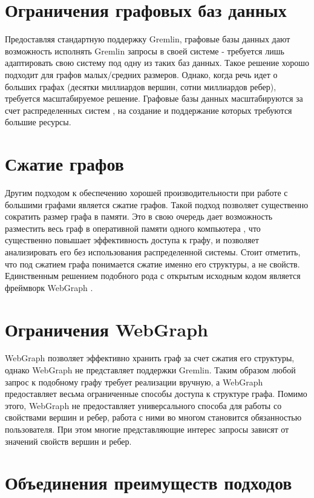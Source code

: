 \documentclass[times,specification,annotation]{itmo-student-thesis}
\begin{document}
\section{Ограничения графовых баз данных}

Предоставляя стандартную поддержку Gremlin, графовые базы данных дают возможность исполнять Gremlin запросы в своей системе - требуется лишь адаптировать свою систему под одну из таких баз данных. Такое решение хорошо подходит для графов малых/средних размеров. Однако, когда речь идет о больших графах (десятки миллиардов вершин, сотни миллиардов ребер), требуется масштабируемое решение. Графовые базы данных масштабируются за счет распределенных систем \cite{graph-db-scale}, на создание и поддержание которых требуются большие ресурсы.

\section{Сжатие графов}

Другим подходом к обеспечению хорошей производительности при работе с большими графами является сжатие графов. Такой подход позволяет существенно сократить размер графа в памяти. Это в свою очередь дает возможность разместить весь граф в оперативной памяти одного компьютера \cite{saner}, что существенно повышает эффективность доступа к графу, и позволяет анализировать его без использования распределенной системы. Стоит отметить, что под сжатием графа понимается сжатие именно его структуры, а не свойств. Единственным решением подобного рода с открытым исходным кодом является фреймворк WebGraph \cite{webgraph}.

\section{Ограничения WebGraph}

WebGraph позволяет эффективно хранить граф за счет сжатия его структуры, однако WebGraph не представляет поддержки Gremlin. Таким образом любой запрос к подобному графу требует реализации вручную, а WebGraph предоставляет весьма ограниченные способы доступа к структуре графа.
Помимо этого, WebGraph не предоставляет универсального способа для работы со свойствами вершин и ребер, работа с ними во многом становится обязанностью пользователя. При этом многие представляющие интерес запросы зависят от значений свойств вершин и ребер.

\section{Объединения преимуществ подходов}
\end{document}
